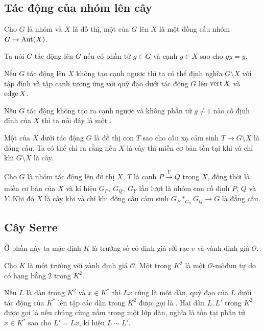 \subsection{Tác động của nhóm lên cây}
\begin{define}
    Cho $G$ là nhóm và $X$ là đồ thị, một  của $G$ lên $X$ là một đồng cấu nhóm $G \rightarrow \operatorname{Aut}(X)$.

    Ta nói $G$ tác động  lên $G$ nếu có phần tử $g \in G$ và cạnh $y \in X$ sao cho $gy = \overline{y}$.

    Nếu $G$ tác động lên $X$ không tạo cạnh ngược thì ta có thể định nghĩa  $G \setminus X$ với tập đỉnh và tập cạnh tương ứng với quỹ đạo dưới tác động $G$ lên $\operatorname{vert} X$ và $\operatorname{edge} X$.

    Nếu $G$ tác động không tạo ra cạnh ngược và không phần tử $g \neq 1$ nào cố định đỉnh của $X$ thì ta nói đây là một .

    Một  của $X$ dưới tác động $G$ là đồ thị con $T$ sao cho cấu xạ cảm sinh $T \rightarrow G \setminus X$ là đẳng cấu. Ta có thể chỉ ra rằng nếu $X$ là cây thì miền cơ bản tồn tại khi và chỉ khi $G \setminus X$ là cây.
\end{define}

\begin{theorem}\label{thm:bass-serre-fund}
    Cho $G$ là nhóm tác động lên đồ thị $X$, $T$ là cạnh $P \xrightarrow[]{Y} Q$ trong $X$, đồng thời là miền cơ bản của $X$ và kí hiệu $G_P,\ G_Q,\ G_Y$ lần lượt là nhóm con cố định $P$, $Q$ và $Y$. Khi đó $X$ là cây khi và chỉ khi đồng cấu cảm sinh $G_P *_{G_Y} G_Q \rightarrow G$ là đẳng cấu.
\end{theorem}

\subsection{Cây Serre}
Ở phần này ta mặc định $K$ là trường số có định giá rời rạc $v$ và vành định giá $\mathcal{O}$.

\begin{define}
    Cho $K$ là một trường với vành định giá $\mathcal{O}$. Một  trong $K^2$ là một $\mathcal{O}$-môđun tự do có hạng bằng $2$ trong $K^2$.
\end{define}

\begin{remark}
    Nếu $L$ là dàn trong $K^2$ và $x \in K^*$ thì $L x$ cũng là một dàn, quỹ đạo của $L$ dưới tác động của $K^*$ lên tập các dàn trong $K^2$ được gọi là . Hai dàn $L, L'$ trong $K^2$ được gọi là  nếu chúng cùng nằm trong một lớp dàn, nghĩa là tồn tại phần tử $x \in K^*$ sao cho $L' = L x$, kí hiệu $L \sim L'$.
\end{remark}

